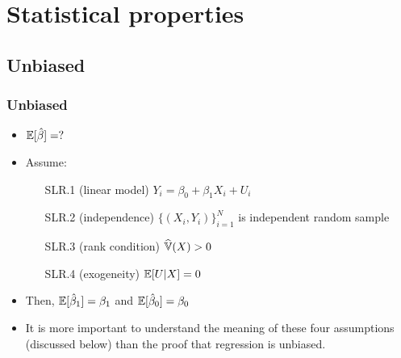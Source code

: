 \section{Statistical properties}

\subsection{Unbiased}
\begin{frame}[allowframebreaks]
  \frametitle{Unbiased}
  \begin{itemize}
  \item $\mathbb{E}[\hat{\beta}] = ?$
  \item Assume:
    \begin{enumerate}
    \item[SLR.1]\label{s1} (linear model) $ Y_i = \beta_0 + \beta_1
      X_i + U_i $
    \item[SLR.2]\label{s2} (independence) $\{(X_i,Y_i)\}_{i=1}^N$ is independent random
      sample
    \item[SLR.3]\label{s3} (rank condition) $\widehat{\mathbb{V}}(X) > 0$
    \item[SLR.4]\label{s4} (exogeneity) $\mathbb{E}[U | X] = 0$
    \end{enumerate}
  \item Then, $\mathbb{E}[\hat{\beta}_1] = \beta_1$ and $\mathbb{E}[\hat{\beta}_0] = \beta_0$
\item It is more important to understand the meaning of these four
assumptions (discussed below) than the proof that regression is
unbiased.    
\end{itemize}
\end{frame}

